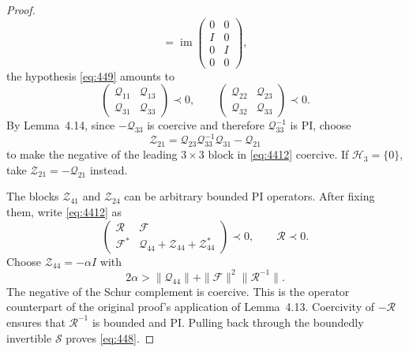 \documentclass[10pt,a4paper]{article}
\newcommand{\op}[1]{\mathcal{#1}}
\begin{document}
\begin{proof}
\[ =\operatorname{im}\begin{pmatrix}0&0\\I&0\\0&I\\0&0\end{pmatrix},
\]
the hypothesis \eqref{eq:449} amounts to
\[
 \begin{pmatrix}\op Q_{11}&\op Q_{13}\\
                 \op Q_{31}&\op Q_{33}\end{pmatrix}\prec0,
 \qquad
 \begin{pmatrix}\op Q_{22}&\op Q_{23}\\
                 \op Q_{32}&\op Q_{33}\end{pmatrix}\prec0.
\]
By Lemma~4.14, since $-\op Q_{33}$ is coercive and therefore
$\op Q_{33}^{-1}$ is PI, choose
\[
 \op Z_{21}=\op Q_{23}\op Q_{33}^{-1}\op Q_{31}-\op Q_{21}
\]
to make the negative of the leading $3\times3$ block in
\eqref{eq:4412} coercive. If $\op H_3=\{0\}$, take
$\op Z_{21}=-\op Q_{21}$ instead.

The blocks $\op Z_{41}$ and $\op Z_{24}$ can be arbitrary bounded
PI operators. After fixing them, write \eqref{eq:4412} as
\[
 \begin{pmatrix}
 \op R&\op F\\
 \op F^*&\op Q_{44}+\op Z_{44}+\op Z_{44}^*
 \end{pmatrix}\prec0,\qquad \op R\prec0.
\]
Choose $\op Z_{44}=-\alpha I$ with
\[
 2\alpha>\|\op Q_{44}\|+\|\op F\|^2\|\op R^{-1}\|.
\]
The negative of the Schur complement is coercive. This is the operator
counterpart of the original proof's application of Lemma~4.13.
Coercivity of $-\op R$ ensures that $\op R^{-1}$ is bounded and PI.
Pulling back through the boundedly invertible $\op S$
proves \eqref{eq:448}.
\end{proof}
\end{document}
